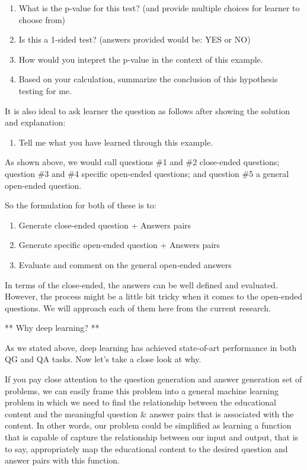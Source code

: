 \documentclass{acm_proc_article-sp}
\providecommand{\tightlist}{%
  \setlength{\itemsep}{0pt}\setlength{\parskip}{0pt}}
\begin{document}
\begin{enumerate}
\def\labelenumi{\arabic{enumi}.}
\item
  What is the p-value for this test? (and provide multiple choices for
  learner to choose from)
\item
  Is this a 1-sided test? (answers provided would be: YES or NO)
\item
  How would you intepret the p-value in the context of this example.
\item
  Based on your calculation, summarize the conclusion of this hypothesis
  testing for me.
\end{enumerate}

It is also ideal to ask learner the question as follows after showing
the solution and explanation:

\begin{enumerate}
\def\labelenumi{\arabic{enumi}.}
\setcounter{enumi}{4}
\tightlist
\item
  Tell me what you have learned through this example.
\end{enumerate}

As shown above, we would call questions \#1 and \#2 close-ended
questions; question \#3 and \#4 specific open-ended questions; and
question \#5 a general open-ended question.

So the formulation for both of these is to:

\begin{enumerate}
\def\labelenumi{\arabic{enumi}.}
\item
  Generate close-ended question + Answers pairs
\item
  Generate specific open-ended question + Answers pairs
\item
  Evaluate and comment on the general open-ended answers
\end{enumerate}

In terms of the close-ended, the answers can be well defined and
evaluated. However, the process might be a little bit tricky when it
comes to the open-ended questions. We will approach each of them here
from the current research.

** Why deep learning? **

As we stated above, deep learning has achieved state-of-art performance
in both QG and QA tasks. Now let's take a close look at why.

If you pay close attention to the question generation and answer
generation set of problems, we can easily frame this problem into a
general machine learning problem in which we need to find the
relationship between the educational content and the meaningful question
\& answer pairs that is associated with the content. In other words, our
problem could be simplified as learning a function that is capable of
capture the relationship between our input and output, that is to say,
appropriately map the educational content to the desired question and
answer pairs with this function.
\end{document}
